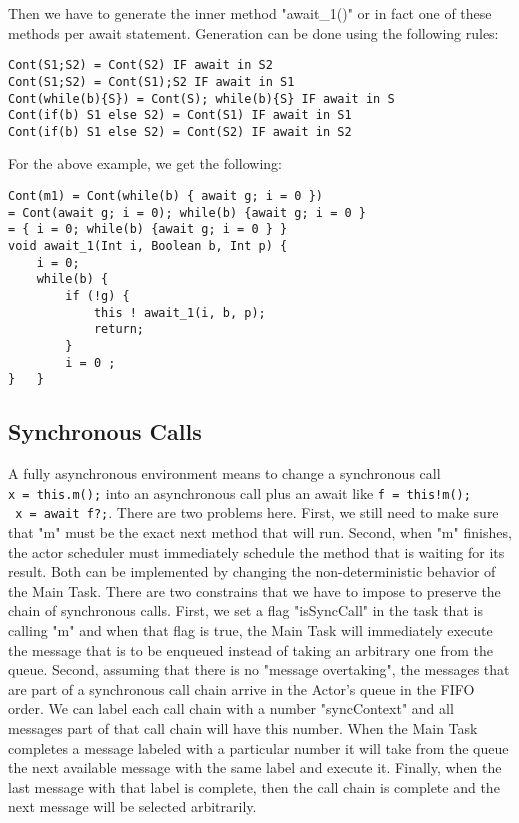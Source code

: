 Then we have to generate the inner method "await\_1()" or in fact one of these methods per await statement. Generation can be done using the following rules:

\begin{lstlisting}
Cont(S1;S2) = Cont(S2) IF await in S2
Cont(S1;S2) = Cont(S1);S2 IF await in S1
Cont(while(b){S}) = Cont(S); while(b){S} IF await in S
Cont(if(b) S1 else S2) = Cont(S1) IF await in S1
Cont(if(b) S1 else S2) = Cont(S2) IF await in S2
\end{lstlisting}
For the above example, we get the following:

\begin{lstlisting}
Cont(m1) = Cont(while(b) { await g; i = 0 })
= Cont(await g; i = 0); while(b) {await g; i = 0 }
= { i = 0; while(b) {await g; i = 0 } }
void await_1(Int i, Boolean b, Int p) {
	i = 0; 
	while(b) {
		if (!g) {
			this ! await_1(i, b, p);
			return;
		}
		i = 0 ;
}	}
\end{lstlisting}

\subsection{Synchronous Calls}
A fully asynchronous environment means to change a synchronous call \\ \lstinline|x = this.m();| into an asynchronous call plus an await like \lstinline|f = this!m();| \\ \lstinline| x = await f?;|. There are two problems here. First, we still need to make sure that "m" must be the exact next method that will run. Second, when "m" finishes, the actor scheduler must immediately schedule the method that is waiting for its result. Both can be implemented by changing the non-deterministic behavior of the Main Task. There are two constrains that we have to impose to preserve the chain of synchronous calls. First, we set a flag "isSyncCall" in the task that is calling "m" and when that flag is true, the Main Task will immediately execute the message that is to be enqueued instead of taking an arbitrary one from the queue. Second, assuming that there is no "message overtaking", the messages that are part of a synchronous call chain arrive in the Actor's queue in the FIFO order. We can label each call chain with a number "syncContext" and all messages part of that call chain will have this number. When the Main Task completes a message labeled with a particular number it will take from the queue the next available message with the same label and execute it. Finally, when the last message with that label is complete, then the call chain is complete and the next message will be selected arbitrarily.

